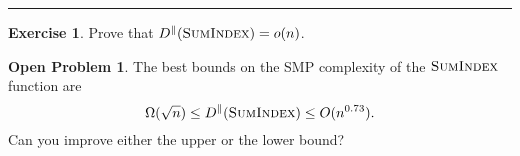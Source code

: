 \documentclass[11pt]{amsart}
\theoremstyle{plain}
\theoremstyle{definition}
\newtheorem{exercise}{Exercise}
\newtheorem{open}{Open Problem}
\theoremstyle{plain}
\newcommand{\SumIndex}{\textsc{SumIndex}}
\newcommand{\exercises}{\bigskip \noindent\rule{8cm}{0.4pt} \medskip}
\begin{document}
\exercises

\begin{exercise}
Prove that $D^\parallel(\SumIndex) = o(n)$.
\end{exercise}

\begin{open}
The best bounds on the SMP complexity of the $\SumIndex$ function are
\[
\Omega(\sqrt{n}) \le D^\parallel(\SumIndex) \le O(n^{0.73}).
\]
Can you improve either the upper or the lower bound?
\end{open}
\end{document}
